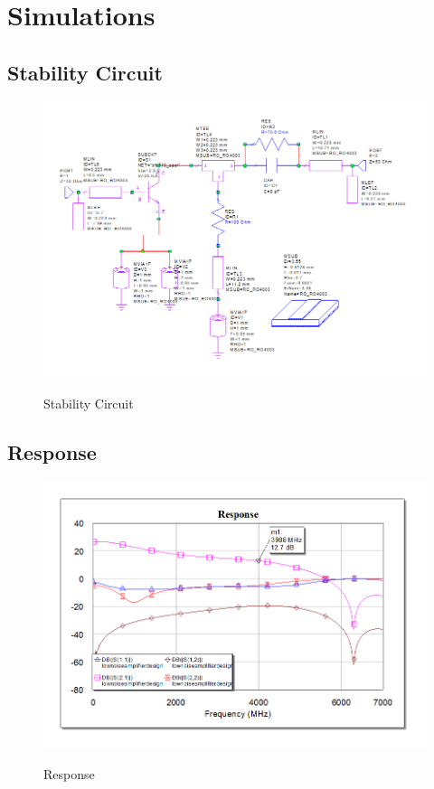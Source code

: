 \chapter*{Simulations} 
\section{ Stability Circuit} \label{ Stability Circuit } 
\begin{figure}[H]
\centering
{\includegraphics[scale=0.5]{1.png}}
\caption{ Stability Circuit }
\end{figure}

\section{ Response } \label{ Response } 
\begin{figure}[H]
\centering
{\includegraphics[scale=0.5]{2.png}}
\caption{ Response}
\end{figure}


